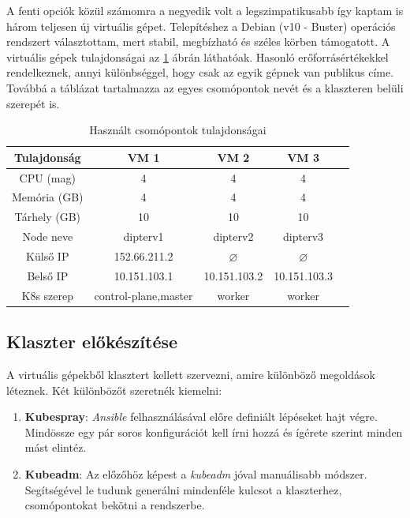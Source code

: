A fenti opciók közül számomra a negyedik volt a legszimpatikusabb így kaptam is három teljesen új virtuális gépet. Telepítéshez a Debian (v10 - Buster) operációs rendszert választottam, mert stabil, megbízható és széles körben támogatott. A virtuális gépek tulajdonságai az \ref{tab:nodes} ábrán láthatóak. Hasonló erőforrásértékekkel rendelkeznek, annyi különbséggel, hogy csak az egyik gépnek van publikus címe. Továbbá a táblázat tartalmazza az egyes csomópontok nevét és a klaszteren belüli szerepét is.

\begin{table}[ht]
\centering
  \begin{tabular}{c|cccc}
	  Tulajdonság & VM 1 & VM 2 & VM 3 \\
    \hline
	CPU (mag) & 4 & 4 & 4 \\ 
	Memória (GB) & 4 & 4 & 4 \\
	Tárhely (GB) & 10 & 10 & 10 \\  
	Node neve & dipterv1 & dipterv2 & dipterv3 \\ 
	Külső IP & 152.66.211.2 & $\varnothing$ & $\varnothing$ \\ 
	Belső IP & 10.151.103.1 & 10.151.103.2 & 10.151.103.3 \\
	K8s szerep& control-plane,master & worker & worker \\
  \end{tabular}
  
  \caption{Használt csomópontok tulajdonságai}
\label{tab:nodes}
\end{table}

\subsection{Klaszter előkészítése}
A virtuális gépekből klasztert kellett szervezni, amire különböző megoldások léteznek.\citep{kubernetesInstall} Két különbözőt szeretnék kiemelni:
\begin{enumerate}
  \item \textbf{Kubespray}: \textit{Ansible} felhasználásával előre definiált lépéseket hajt végre. Mindössze egy pár soros konfigurációt kell írni hozzá és ígérete szerint minden mást elintéz.
  \item \textbf{Kubeadm}: Az előzőhöz képest a \textit{kubeadm} jóval manuálisabb módszer. Segítségével le tudunk generálni mindenféle kulcsot a klaszterhez, csomópontokat bekötni a rendszerbe.
\end{enumerate}

